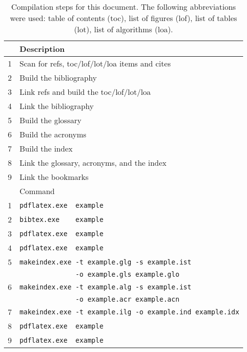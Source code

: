 \begin{table}
    \centering
    \begin{tabular}{rl}
        \toprule
        & Description                                                    \\
        \midrule
        1 & Scan for refs, toc/lof/lot/loa items and cites                 \\
        2 & Build the bibliography                                         \\
        3 & Link refs and build the toc/lof/lot/loa                        \\
        4 & Link the bibliography                                          \\
        5 & Build the glossary                                             \\
        6 & Build the acronyms                                             \\
        7 & Build the index                                                \\
        8 & Link the glossary, acronyms, and the index                     \\
        9 & Link the bookmarks                                             \\
        \midrule
        & Command                                                        \\
        \midrule
        1 & \verb|pdflatex.exe  example|                                     \\
        2 & \verb|bibtex.exe    example|                                       \\
        3 & \verb|pdflatex.exe  example|                                     \\
        4 & \verb|pdflatex.exe  example|                                     \\
        5 & \verb|makeindex.exe -t example.glg -s example.ist|             \\
        & \verb|              -o example.gls example.glo|                              \\
        6 & \verb|makeindex.exe -t example.alg -s example.ist|             \\
        & \verb|              -o example.acr example.acn|                              \\
        7 & \verb|makeindex.exe -t example.ilg -o example.ind example.idx| \\
        8 & \verb|pdflatex.exe  example|                                     \\
        9 & \verb|pdflatex.exe  example|                                     \\
        \bottomrule
    \end{tabular}
    \caption{Compilation steps for this document. The following abbreviations were used: table of contents (toc), list of figures (lof), list of tables (lot), list of algorithms (loa).}
    \label{tab:compile} %
\end{table}


